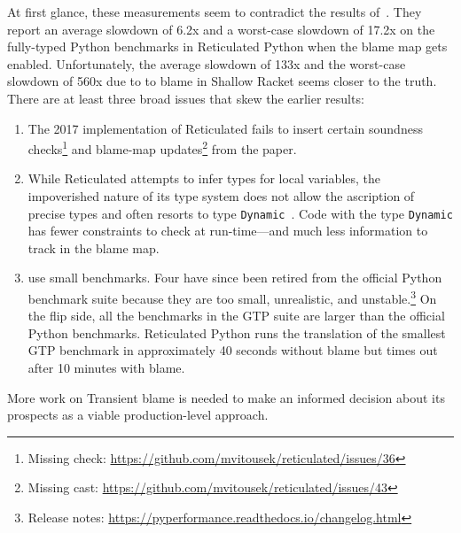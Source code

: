 At first glance, these measurements seem to contradict the results
of~\citet{vss-popl-2017}. They report an average slowdown of 6.2x and a
worst-case slowdown of 17.2x on the fully-typed Python benchmarks in Reticulated
Python when the blame map gets enabled.  Unfortunately, the average slowdown of 
133x and the
worst-case slowdown of 560x  due to to blame  in Shallow Racket seems closer to the truth.  There are at
least three broad issues that skew the earlier results:
\begin{enumerate}

\item The 2017 implementation of Reticulated fails to insert certain soundness
checks\footnote{Missing check:
\url{https://github.com/mvitousek/reticulated/issues/36}} and blame-map
updates\footnote{Missing cast:
\url{https://github.com/mvitousek/reticulated/issues/43}} from the paper.

\item While Reticulated attempts to infer types for local variables, the impoverished nature of its type
    system does not allow the ascription of precise types and often resorts
    to type {\tt Dynamic}~\citep[section~5.4.4]{g-dissertation-2020}. 
    Code with the type {\tt Dynamic}
    has fewer constraints to check at run-time---and much less information
    to track in the blame map.

\item \citet{vss-popl-2017} use small benchmarks.  Four have since been retired
from the official Python benchmark suite because they are too small,
unrealistic, and unstable.\footnote{Release notes:
\url{https://pyperformance.readthedocs.io/changelog.html}}  On the flip
    side, all the benchmarks in the GTP suite are larger than the official Python
    benchmarks. Reticulated Python  runs the
    translation of the smallest GTP benchmark in
    approximately 40 seconds without blame but times out after 10 minutes
    with blame.

\end{enumerate}
More work on Transient blame is needed to make an informed decision about
its prospects as a viable production-level approach. 


